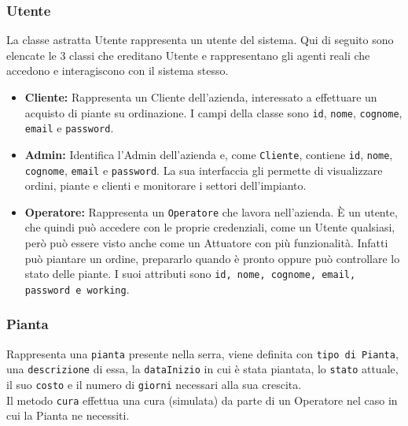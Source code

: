 \documentclass{article}
\newcommand{\code}[1]{\texttt{#1}}
\begin{document}
\subsubsection{Utente}
La classe astratta Utente rappresenta un utente del sistema. 
Qui di seguito sono elencate le 3 classi che ereditano Utente e rappresentano gli agenti reali che accedono e interagiscono con il sistema stesso.

\begin{itemize}
    \item \textbf{Cliente:}
    Rappresenta un Cliente dell'azienda, interessato a effettuare un acquisto di piante su ordinazione. I campi della classe sono \code{id}, \code{nome}, \code{cognome}, \code{email} e \code{password}.

    \item \textbf{Admin:} Identifica l'Admin dell'azienda e, come \code{Cliente}, contiene \code{id}, \code{nome}, \code{cognome}, \code{email} e \code{password}. 
    La sua interfaccia gli permette di visualizzare ordini, piante e clienti e monitorare i settori dell'impianto.

    \item \textbf{Operatore:}
    Rappresenta un \code{Operatore} che lavora nell'azienda. È un utente, che quindi può accedere con le proprie credenziali, come un Utente qualsiasi, però può essere visto anche come un Attuatore con più funzionalità. Infatti può piantare un ordine, prepararlo quando è pronto oppure può controllare lo stato delle piante. I suoi attributi sono \code{id, nome, cognome, email, password e working}.
\end{itemize}

\subsubsection{Pianta}
    Rappresenta una \code{pianta} presente nella serra, viene definita con \code{tipo di Pianta}, una \code{descrizione} di essa, la \code{dataInizio} in cui è stata piantata, lo \code{stato} attuale, il suo \code{costo} e il numero di \code{giorni} necessari alla sua crescita.\\
    Il metodo \code{cura} effettua una cura (simulata) da parte di un Operatore nel caso in cui la Pianta ne necessiti.
    
\end{document}
